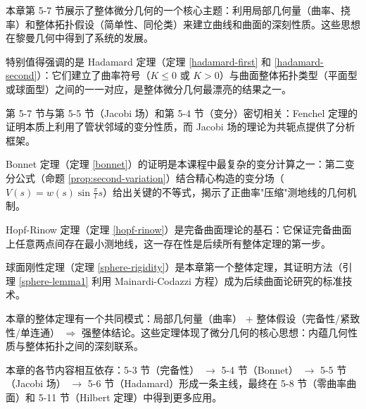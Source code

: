 \begin{Remark}
本章第 5-7 节展示了整体微分几何的一个核心主题：利用局部几何量（曲率、挠率）和整体拓扑假设（简单性、同伦类）来建立曲线和曲面的深刻性质。这些思想在黎曼几何中得到了系统的发展。
\end{Remark}

\begin{Remark}
特别值得强调的是 Hadamard 定理（定理 \ref{hadamard-first} 和 \ref{hadamard-second}）：它们建立了曲率符号（$K \leq 0$ 或 $K>0$）与曲面整体拓扑类型（平面型或球面型）之间的一一对应，是整体微分几何最漂亮的结果之一。
\end{Remark}

\begin{Remark}
第 5-7 节与第 5-5 节（Jacobi 场）和第 5-4 节（变分）密切相关：Fenchel 定理的证明本质上利用了管状邻域的变分性质，而 Jacobi 场的理论为共轭点提供了分析框架。
\end{Remark}

\begin{Remark}
Bonnet 定理（定理 \ref{bonnet}）的证明是本课程中最复杂的变分计算之一：第二变分公式（命题 \ref{prop:second-variation}）结合精心构造的变分场（$V(s) = w(s)\sin\frac{\pi}{l}s$）给出关键的不等式，揭示了正曲率"压缩"测地线的几何机制。
\end{Remark}

\begin{Remark}
Hopf-Rinow 定理（定理 \ref{hopf-rinow}）是完备曲面理论的基石：它保证完备曲面上任意两点间存在最小测地线，这一存在性是后续所有整体定理的第一步。
\end{Remark}

\begin{Remark}
球面刚性定理（定理 \ref{sphere-rigidity}）是本章第一个整体定理，其证明方法（引理 \ref{sphere-lemma1} 利用 Mainardi-Codazzi 方程）成为后续曲面论研究的标准技术。
\end{Remark}

\begin{Remark}
本章的整体定理有一个共同模式：局部几何量（曲率） + 整体假设（完备性/紧致性/单连通） $\Longrightarrow$ 强整体结论。这些定理体现了微分几何的核心思想：内蕴几何性质与整体拓扑之间的深刻联系。
\end{Remark}

\begin{Remark}
本章的各节内容相互依存：5-3 节（完备性） $\to$ 5-4 节（Bonnet） $\to$ 5-5 节（Jacobi 场） $\to$ 5-6 节（Hadamard）形成一条主线，最终在 5-8 节（零曲率曲面）和 5-11 节（Hilbert 定理）中得到更多应用。
\end{Remark}

